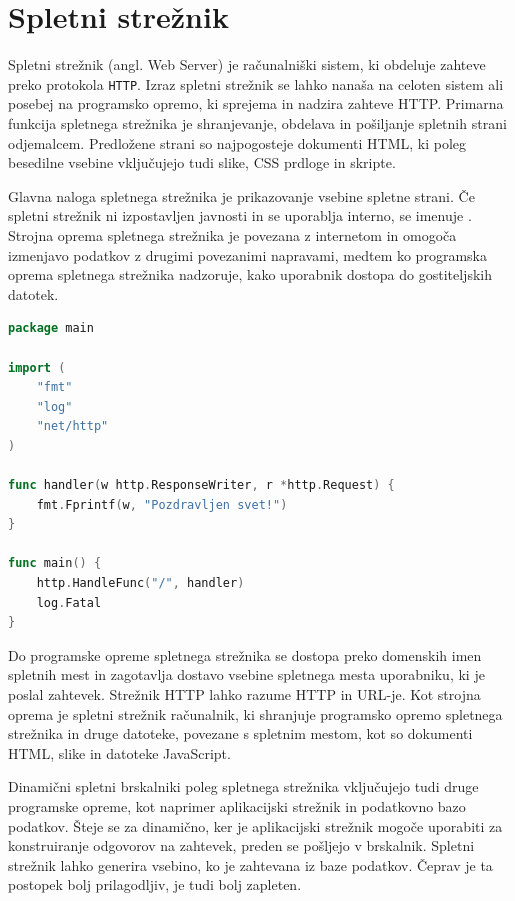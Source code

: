 \documentclass[a4paper, 12pt]{book}
\begin{document}
\section{Spletni strežnik}

Spletni strežnik (angl. Web Server) je računalniški sistem, ki obdeluje zahteve preko protokola \verb=HTTP=. Izraz spletni strežnik se lahko nanaša na celoten sistem ali posebej na programsko opremo, ki sprejema in nadzira zahteve HTTP. Primarna funkcija spletnega strežnika je shranjevanje, obdelava in pošiljanje spletnih strani odjemalcem. Predložene strani so najpogosteje dokumenti HTML, ki poleg besedilne vsebine vključujejo tudi slike, CSS prdloge in skripte. 

Glavna naloga spletnega strežnika je prikazovanje vsebine spletne strani. Če spletni strežnik ni izpostavljen javnosti in se uporablja interno, se imenuje . Strojna oprema spletnega strežnika je povezana z internetom in omogoča izmenjavo podatkov z drugimi povezanimi napravami, medtem ko programska oprema spletnega strežnika nadzoruje, kako uporabnik dostopa do gostiteljskih datotek.

\begin{lstlisting}[language=go, style=mystyle,caption={Spletni strežnik v programskem jeziku Go},label=lst:ws-go]
package main

import (
    "fmt"
    "log"
    "net/http"
)

func handler(w http.ResponseWriter, r *http.Request) {
    fmt.Fprintf(w, "Pozdravljen svet!")
}

func main() {
    http.HandleFunc("/", handler)
    log.Fatal
}
\end{lstlisting}


Do programske opreme spletnega strežnika se dostopa preko domenskih imen spletnih mest in zagotavlja dostavo vsebine spletnega mesta uporabniku, ki je poslal zahtevek. Strežnik HTTP lahko razume HTTP in URL-je. Kot strojna oprema je spletni strežnik računalnik, ki shranjuje programsko opremo spletnega strežnika in druge datoteke, povezane s spletnim mestom, kot so dokumenti HTML, slike in datoteke JavaScript.

Dinamični spletni brskalniki poleg spletnega strežnika vključujejo tudi druge programske opreme, kot naprimer aplikacijski strežnik in podatkovno bazo podatkov. Šteje se za dinamično, ker je aplikacijski strežnik mogoče uporabiti za konstruiranje odgovorov na zahtevek, preden se pošljejo v brskalnik. Spletni strežnik lahko generira vsebino, ko je zahtevana iz baze podatkov. Čeprav je ta postopek bolj prilagodljiv, je tudi bolj zapleten.
\end{document}
